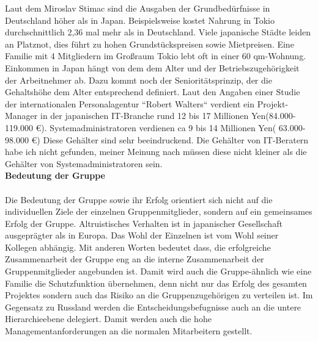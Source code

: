 		Laut dem Miroslav Stimac sind die Ausgaben der Grundbedürfnisse in Deutschland höher als in Japan.
		  Beispielsweise kostet Nahrung in Tokio durchschnittlich 2,36 mal mehr als in Deutschland. Viele japanische Städte leiden an Platznot, dies führt zu hohen Grundstückspreisen sowie Mietpreisen.
		  Eine Familie mit 4 Mitgliedern im Großraum Tokio lebt oft in einer 60 qm-Wohnung.\\
		 Einkommen in Japan hängt von dem dem Alter und der Betriebszugehörigkeit
		 der Arbeitnehmer ab. Dazu kommt noch der Senioritätsprinzip, der die Gehaltshöhe dem Alter entsprechend definiert. Laut den Angaben  einer Studie der internationalen Personalagentur ``Robert Walters`` verdient ein Projekt-Manager in der japanischen IT-Branche rund 12 bis 17 Millionen Yen(84.000-119.000 €).
		 Systemadministratoren verdienen ca 9 bis 14 Millionen Yen(	
		 63.000-98.000 €)
		Diese Gehälter sind sehr beeindruckend. Die Gehälter von IT-Beratern habe ich nicht gefunden, meiner Meinung nach müssen diese nicht kleiner als die  Gehälter von Systemadministratoren sein. 
	\\
			\textbf{Bedeutung der Gruppe}\\
			\\
		Die Bedeutung der Gruppe sowie ihr Erfolg orientiert sich nicht auf die individuellen Ziele der	einzelnen Gruppenmitglieder, sondern auf ein gemeinsames Erfolg der Gruppe. Altruistisches Verhalten ist in japanischer Gesellschaft ausgeprägter als in Europa. Das Wohl der Einzelnen ist vom Wohl seiner Kollegen abhängig. Mit anderen Worten bedeutet dass, die erfolgreiche Zusammenarbeit der Gruppe eng an die interne Zusammenarbeit der Gruppenmitglieder angebunden  ist. Damit wird auch die Gruppe-ähnlich wie eine Familie die Schutzfunktion übernehmen, denn nicht nur das Erfolg des gesamten Projektes sondern auch das Risiko an die Gruppenzugehörigen zu verteilen ist.
		Im Gegensatz zu Russland werden die Entscheidungsbefugnisse auch an die untere Hierarchieebene delegiert. Damit werden auch die hohe Managementanforderungen  an die normalen Mitarbeitern gestellt.
		

